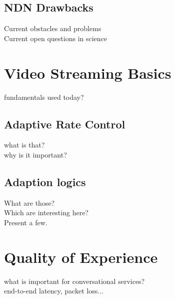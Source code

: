 \subsection{NDN Drawbacks}
Current obstacles and problems \\
Current open questions in science \\

\section{Video Streaming Basics}
fundamentals used today?

\subsection{Adaptive Rate Control}
what is that? \\
why is it important?

\subsection{Adaption logics}
What are those? \\
Which are interesting here? \\
Present a few.

\section{Quality of Experience}
what is important for conversational services? \\
end-to-end latency, packet loss...

